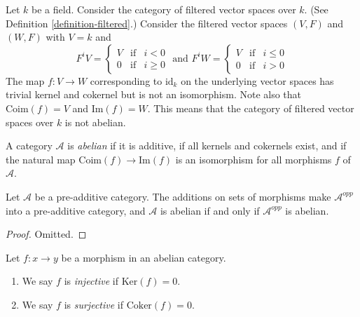 \begin{example}
\label{example-not-abelian}
Let $k$ be a field.
Consider the category
of filtered vector spaces over $k$.
(See Definition \ref{definition-filtered}.)
Consider the filtered vector spaces $(V, F)$ and $(W, F)$ with
$V = k$ and
$$
F^iV
=
\left\{
\begin{matrix}
V & \text{if} & i < 0 \\
0 & \text{if} & i \geq 0
\end{matrix}
\right.
\text{ and }
F^iW
=
\left\{
\begin{matrix}
V & \text{if} & i \leq 0 \\
0 & \text{if} & i > 0
\end{matrix}
\right.
$$
The map $f : V \to W$ corresponding to $\text{id}_k$ on the underlying
vector spaces has trivial kernel and cokernel but is not
an isomorphism. Note also that $\text{Coim}(f) = V$ and $\text{Im}(f) = W$.
This means that the category of filtered vector spaces over $k$
is not abelian.
\end{example}

\begin{definition}
\label{definition-abelian-category}
A category $\mathcal{A}$ is {\it abelian} if
it is additive, if all kernels and cokernels exist,
and if the natural map $\text{Coim}(f) \to \text{Im}(f)$
is an isomorphism for all morphisms $f$ of
$\mathcal{A}$.
\end{definition}

\begin{lemma}
\label{lemma-abelian-opposite}
Let $\mathcal{A}$ be a pre-additive category.
The additions on sets of morphisms make
$\mathcal{A}^{opp}$ into a pre-additive category,
and $\mathcal{A}$ is abelian if and only if $\mathcal{A}^{opp}$
is abelian.
\end{lemma}

\begin{proof}
Omitted.
\end{proof}

\begin{definition}
\label{definition-injective-surjective}
Let $f : x \to y$ be a morphism in an abelian category.
\begin{enumerate}
\item We say $f$ is {\it injective} if $\text{Ker}(f) = 0$.
\item We say $f$ is {\it surjective} if $\text{Coker}(f) = 0$.
\end{enumerate}
\end{definition}

